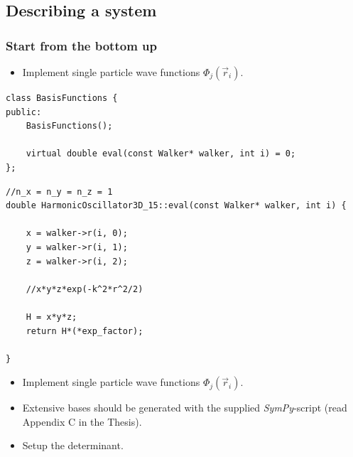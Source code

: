 \documentclass{beamer}
\begin{document}
\subsection{Describing a system}

\begin{frame}[containsverbatim]\frametitle{Start from the bottom up}
 
 \begin{itemize}
    \item Implement single particle wave functions $\Phi_j(\vec r_i)$.
 \end{itemize}

 
\scriptsize
 \begin{verbatim}
class BasisFunctions {
public:
    BasisFunctions();
    
    virtual double eval(const Walker* walker, int i) = 0;
};
 \end{verbatim}
\normalsize

\end{frame}


 
\scriptsize
\begin{frame}[containsverbatim]
 \begin{verbatim}
//n_x = n_y = n_z = 1
double HarmonicOscillator3D_15::eval(const Walker* walker, int i) {

    x = walker->r(i, 0);
    y = walker->r(i, 1);
    z = walker->r(i, 2);
    
    //x*y*z*exp(-k^2*r^2/2)
    
    H = x*y*z;
    return H*(*exp_factor);
    
}
 \end{verbatim}
\end{frame}
\normalsize


\begin{frame}

 \begin{itemize}
    \item Implement single particle wave functions $\Phi_j(\vec r_i)$.
    \item Extensive bases should be generated with the supplied \textit{SymPy}-script (read Appendix C in the Thesis).
    \pause \item Setup the determinant.
\end{itemize}

\end{frame}
\end{document}
